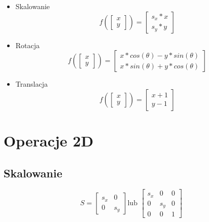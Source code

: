 \documentclass{../notatki}
\begin{document}
\begin{itemize}
  \item Skalowanie\\
    $$
    f(
      \begin{bmatrix}
        x \\
        y
      \end{bmatrix}
    )
    =
    \begin{bmatrix}
      s_x * x \\
      s_y * y
    \end{bmatrix}
    $$
  \item Rotacja\\
    $$
    f(
      \begin{bmatrix}
        x \\
        y
      \end{bmatrix}
    )
    =
    \begin{bmatrix}
      x * cos(\theta) - y * sin(\theta) \\
      x * sin(\theta) + y * cos(\theta)
    \end{bmatrix}
    $$
  \item Translacja\\
    $$
    f(
      \begin{bmatrix}
        x \\
        y
      \end{bmatrix}
    )
    =
    \begin{bmatrix}
      x + 1 \\
      y - 1
    \end{bmatrix}
    $$
\end{itemize}

\section{Operacje 2D}

\subsection{Skalowanie}

$$
S =
\begin{bmatrix}
  s_x & 0 \\
  0 & s_y
\end{bmatrix}
\text{lub }
\begin{bmatrix} s_x & 0 & 0 \\ 0 & s_y & 0 \\ 0 & 0 & 1
\end{bmatrix}
$$
\end{document}
